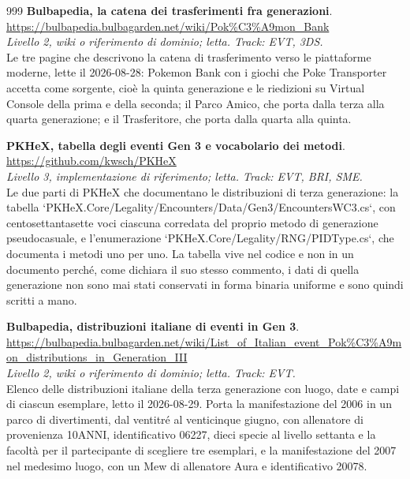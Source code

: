 \begin{thebibliography}{999}
  \textbf{Bulbapedia, la catena dei trasferimenti fra generazioni}.
  \\ \url{https://bulbapedia.bulbagarden.net/wiki/Pok\%C3\%A9mon_Bank}
  \\ \emph{Livello 2, wiki o riferimento di dominio; letta. Track: EVT, 3DS.}
  \\ Le tre pagine che descrivono la catena di trasferimento verso le piattaforme moderne, lette il 2026-08-28: Pokemon Bank con i giochi che Poke Transporter accetta come sorgente, cioè la quinta generazione e le riedizioni su Virtual Console della prima e della seconda; il Parco Amico, che porta dalla terza alla quarta generazione; e il Trasferitore, che porta dalla quarta alla quinta.

  \textbf{PKHeX, tabella degli eventi Gen 3 e vocabolario dei metodi}.
  \\ \url{https://github.com/kwsch/PKHeX}
  \\ \emph{Livello 3, implementazione di riferimento; letta. Track: EVT, BRI, SME.}
  \\ Le due parti di PKHeX che documentano le distribuzioni di terza generazione: la tabella `PKHeX.Core/Legality/Encounters/Data/Gen3/EncountersWC3.cs`, con centosettantasette voci ciascuna corredata del proprio metodo di generazione pseudocasuale, e l'enumerazione `PKHeX.Core/Legality/RNG/PIDType.cs`, che documenta i metodi uno per uno. La tabella vive nel codice e non in un documento perché, come dichiara il suo stesso commento, i dati di quella generazione non sono mai stati conservati in forma binaria uniforme e sono quindi scritti a mano.

  \textbf{Bulbapedia, distribuzioni italiane di eventi in Gen 3}.
  \\ \url{https://bulbapedia.bulbagarden.net/wiki/List_of_Italian_event_Pok\%C3\%A9mon_distributions_in_Generation_III}
  \\ \emph{Livello 2, wiki o riferimento di dominio; letta. Track: EVT.}
  \\ Elenco delle distribuzioni italiane della terza generazione con luogo, date e campi di ciascun esemplare, letto il 2026-08-29. Porta la manifestazione del 2006 in un parco di divertimenti, dal ventitré al venticinque giugno, con allenatore di provenienza 10ANNI, identificativo 06227, dieci specie al livello settanta e la facoltà per il partecipante di scegliere tre esemplari, e la manifestazione del 2007 nel medesimo luogo, con un Mew di allenatore Aura e identificativo 20078.


\end{thebibliography}
